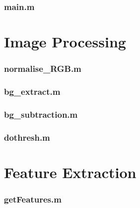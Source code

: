 \subsubsection*{\hypertarget{main}{main.m}}



\section{Image Processing}

\subsubsection*{\hypertarget{normRGB}{normalise\_RGB.m}}


\subsubsection*{\hypertarget{bgextract}{bg\_extract.m}}


\subsubsection*{\hypertarget{bgsub}{bg\_subtraction.m}}


\subsubsection*{\hypertarget{dothresh}{dothresh.m}}



\section{Feature Extraction}
\subsubsection*{\hypertarget{getfeatures}{getFeatures.m}}


